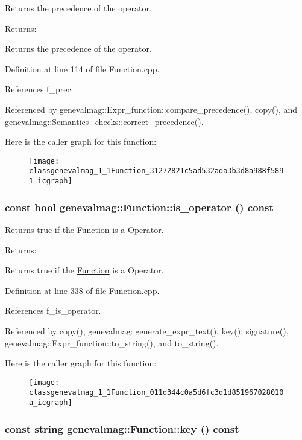 Returns the precedence of the operator. \begin{Desc}
\item[Returns:]\end{Desc}
Returns the precedence of the operator. 

Definition at line 114 of file Function.cpp.

References f\_\-prec.

Referenced by genevalmag::Expr\_\-function::compare\_\-precedence(), copy(), and genevalmag::Semantics\_\-checks::correct\_\-precedence().

Here is the caller graph for this function:\nopagebreak
\begin{figure}[H]
\begin{center}
\leavevmode
\texttt{[image: classgenevalmag\_1\_1Function\_31272821c5ad532ada3b3d8a988f5891\_icgraph]}
\end{center}
\end{figure}
\hypertarget{classgenevalmag_1_1Function_011d344c0a5d6fc3d1d851967028010a}{
\subsubsection[{is\_\-operator}]{\setlength{\rightskip}{0pt plus 5cm}const bool genevalmag::Function::is\_\-operator () const}}
\label{classgenevalmag_1_1Function_011d344c0a5d6fc3d1d851967028010a}


Returns true if the \hyperlink{classgenevalmag_1_1Function}{Function} is a Operator. \begin{Desc}
\item[Returns:]\end{Desc}
Returns true if the \hyperlink{classgenevalmag_1_1Function}{Function} is a Operator. 

Definition at line 338 of file Function.cpp.

References f\_\-is\_\-operator.

Referenced by copy(), genevalmag::generate\_\-expr\_\-text(), key(), signature(), genevalmag::Expr\_\-function::to\_\-string(), and to\_\-string().

Here is the caller graph for this function:\nopagebreak
\begin{figure}[H]
\begin{center}
\leavevmode
\texttt{[image: classgenevalmag\_1\_1Function\_011d344c0a5d6fc3d1d851967028010a\_icgraph]}
\end{center}
\end{figure}
\hypertarget{classgenevalmag_1_1Function_b1928425174bc0856db6a7d700061fca}{
\subsubsection[{key}]{\setlength{\rightskip}{0pt plus 5cm}const string genevalmag::Function::key () const}}
\label{classgenevalmag_1_1Function_b1928425174bc0856db6a7d700061fca}


